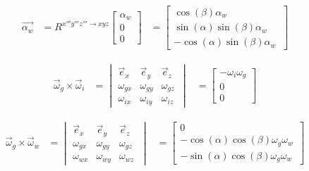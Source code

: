 \begin{equation*}
\begin{split}
\overrightarrow{\alpha_{w}}&=R^{x'''y'''z''' \rightarrow xyz}
	\begin{bmatrix}
	\alpha_{w}\\
	0\\
	0\
	\end{bmatrix}
	&=\begin{bmatrix}
	\cos(\beta)\alpha_{w}\\
	\sin(\alpha)\sin(\beta)\alpha_{w}\\
	-\cos(\alpha)\sin(\beta)\alpha_{w}\
	\end{bmatrix}
\end{split}
\end{equation*}

\begin{equation*}
\begin{split}
\overrightarrow{\omega}_{g}\times\overrightarrow{\omega}_{i}
&=	\begin{vmatrix}
	\overrightarrow{e}_{x} & \overrightarrow{e}_{y} & \overrightarrow{e}_{z}\\
	\omega_{gx} & \omega_{gy} & \omega_{gz}\\
	\omega_{ix} & \omega_{iy} & \omega_{iz}\
	\end{vmatrix}
&=	\begin{bmatrix}
	-\omega_{i}\omega_{g}\\
	0\\
	0\
\end{bmatrix}
\end{split}
\end{equation*}

\begin{equation*}
\begin{split}
\overrightarrow{\omega}_{g}\times\overrightarrow{\omega}_{w}
&=	\begin{vmatrix}
	\overrightarrow{e}_{x} & \overrightarrow{e}_{y} & \overrightarrow{e}_{z}\\
	\omega_{gx} & \omega_{gy} & \omega_{gz}\\
	\omega_{wx} & \omega_{wy} & \omega_{wz}\
	\end{vmatrix}
&=	\begin{bmatrix}
	0\\
	-\cos(\alpha)\cos(\beta)\omega_{g}\omega_{w}\\
	-\sin(\alpha)\cos(\beta)\omega_{g}\omega_{w}\
	\end{bmatrix}
\end{split}
\end{equation*}

